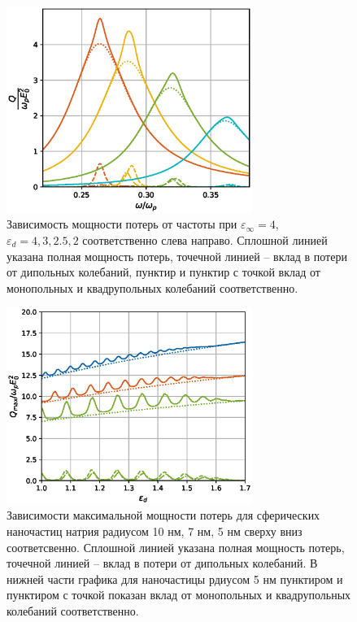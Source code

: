 \documentclass[12pt, a4paper]{article}
\def \eps {\varepsilon}
\begin{document}
\begin{figure}[h]
	\centering
	\includegraphics[width=80mm]{./image/fig1_epsd4.eps}
	\caption{Зависимость мощности потерь от частоты при $\eps_\infty= 4$, $\eps_d = 4, 3, 2.5, 2$ соответственно слева направо. Сплошной линией указана полная мощность потерь, точечной линией – вклад в потери от дипольных колебаний, пунктир и пунктир с точкой вклад от монопольных и квадрупольных колебаний соответственно. }
	\label{fig1_epsd4}
\end{figure} 
\begin{figure}[h]
	\centering
	\includegraphics[width=80mm]{./image/natr2.eps}
	\caption{Зависимости максимальной мощности потерь для сферических наночастиц натрия радиусом 10 нм, 7 нм, 5 нм сверху вниз соответсвенно. Сплошной линией указана полная мощность потерь, точечной линией – вклад в потери от дипольных колебаний. В нижней части графика для наночастицы рдиусом 5 нм пунктиром и пунктиром с точкой показан вклад от монопольных и квадрупольных колебаний соответственно.}
	\label{natr}
\end{figure} 
\end{document}
